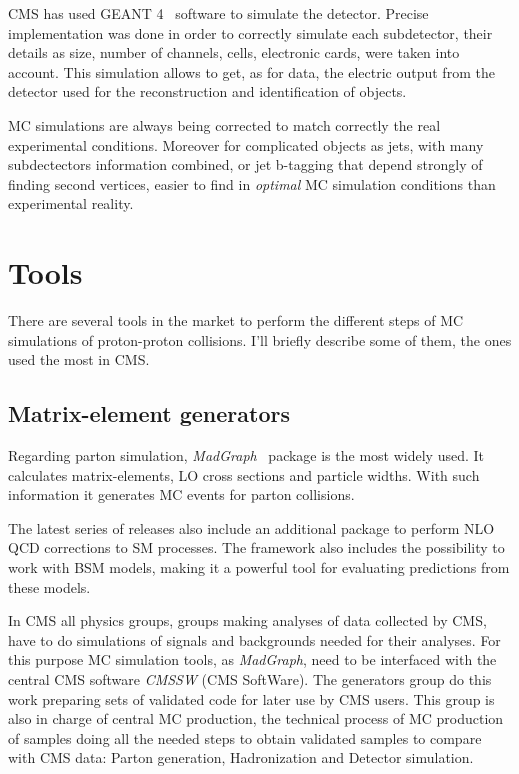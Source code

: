 CMS has used GEANT 4~\cite{Agostinelli:2002hh} software to simulate the detector. Precise implementation was done in order to correctly simulate each subdetector, their details as size, number of channels, cells, electronic cards, were taken into account. This simulation allows to get, as for data, the electric output from the detector used for the reconstruction and identification of objects. 

MC simulations are always being corrected to match correctly the real experimental conditions. Moreover for complicated objects as jets, with many subdectectors information combined, or jet b-tagging that depend strongly of finding second vertices, easier to find in \textit{optimal} MC simulation conditions than experimental reality.

\section{Tools}
\label{sec:tools}

There are several tools in the market to perform the different steps of MC simulations of proton-proton collisions. I'll briefly describe some of them, the ones used the most in CMS.

\subsection{Matrix-element generators}
\label{sec:ME}

Regarding parton simulation, \textit{MadGraph}~\cite{Alwall:2014hca} package is the most widely used. It calculates matrix-elements, LO cross sections and particle widths. With such information it generates MC events for parton collisions. 

The latest series of releases also include an additional package to perform NLO QCD corrections to SM processes. The framework also includes the possibility to work with BSM models, making it a powerful tool for evaluating predictions from these models. 

In CMS all physics groups, groups making analyses of data collected by CMS, have to do simulations of signals and backgrounds needed for their analyses. For this purpose MC simulation tools, as \textit{MadGraph}, need to be interfaced with the central CMS software \textit{CMSSW} (CMS SoftWare). The generators group do this work preparing sets of validated code for later use by CMS users. This group is also in charge of central MC production, the technical process of MC production of samples doing all the needed steps to obtain validated samples to compare with CMS data: Parton generation, Hadronization and Detector simulation. 

